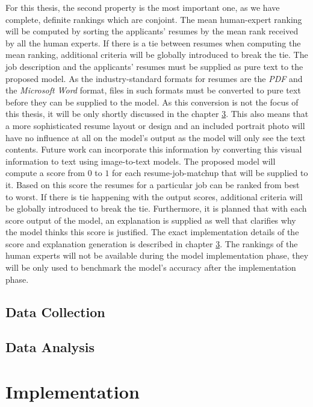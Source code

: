 \documentclass[draft,final]{thesisclass} %
\begin{document}
For this thesis, the second property is the most important one, as we have complete, definite rankings which are conjoint.
The mean human-expert ranking will be computed by sorting the applicants' resumes by the mean rank received by all the human experts.
If there is a tie between resumes when computing the mean ranking, additional criteria will be globally introduced to break the tie.
The job description and the applicants' resumes must be supplied as pure text to the proposed model.
As the industry-standard formats for resumes are the \textit{PDF} and the \textit{Microsoft Word} format, files in such formats must be converted to pure text before they can be supplied to the model.
As this conversion is not the focus of this thesis, it will be only shortly discussed in the chapter \ref{implementation}.
This also means that a more sophisticated resume layout or design and an included portrait photo will have no influence at all on the model's output as the model will only see the text contents.
Future work can incorporate this information by converting this visual information to text using image-to-text models.
The proposed model will compute a score from $0$ to $1$ for each resume-job-matchup that will be supplied to it.
Based on this score the resumes for a particular job can be ranked from best to worst.
If there is tie happening with the output scores, additional criteria will be globally introduced to break the tie.
Furthermore, it is planned that with each score output of the model, an explanation is supplied as well that clarifies why the model thinks this score is justified.
The exact implementation details of the score and explanation generation is described in chapter \ref{implementation}.
The rankings of the human experts will not be available during the model implementation phase, they will be only used to benchmark the model's accuracy after the implementation phase.

\section{Data Collection}
\lipsum[1]

\section{Data Analysis}
\lipsum[1]

\chapter{Implementation} \label{implementation}
\end{document}

